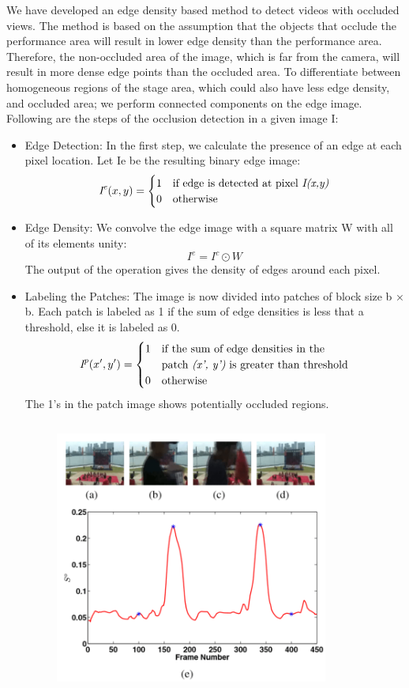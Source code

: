 \documentclass{clsfile}
\begin{document}
We have developed an edge density based method to detect videos
with occluded views. The method is based on the assumption that
the objects that occlude the performance area will result in lower
edge density than the performance area. Therefore, the non-occluded
area of the image, which is far from the camera, will result in more
dense edge points than the occluded area. To differentiate between
homogeneous regions of the stage area, which could also have less
edge density, and occluded area; we perform connected components
on the edge image. Following are the steps of the occlusion
detection in a given image I:
\begin{itemize}
    \item Edge Detection: In the first step, we calculate the presence of
an edge at each pixel location. Let Ie be the resulting binary
edge image:
\begin{equation}
{\textit{I}^{\textit{e}}(x,y)} = 
\begin{cases}
1 & \text{if edge is detected at pixel
\textit{I(x,y)}}\\
0 & \text{otherwise}
\end{cases}
\end{equation}
\item Edge Density: We convolve the edge image with a square
matrix W with all of its elements unity:
\begin{equation}
{\textit{I}^{\textit{e}}} = {\textit{I}^{\textit{c}}} \odot {\textit{W}}
\end{equation}
The output of the operation gives the density of edges around
each pixel.
\item Labeling the Patches: The image is now divided into patches
of block size b × b. Each patch is labeled as 1 if the sum of
edge densities is less that a threshold, else it is labeled as 0.
\begin{equation}
{\textit{I}^{\textit{p}}(x',y')} = 
\begin{cases}
1 & \text{if the sum of edge densities in the}\\
 & \text{patch \textit{(x', y')} is greater than threshold}\\
0 & \text{otherwise}
\end{cases}
\end{equation}
The 1’s in the patch image shows potentially occluded regions.
\begin{figure}
\includegraphics[width=9cm, height=9cm]{fig3.png}

\end{figure}
\end{itemize}
\end{document}
